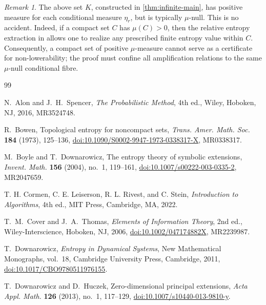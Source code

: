 \documentclass[12pt,letterpaper,reqno]{amsart}
\theoremstyle{definition}
\theoremstyle{remark}
\newtheorem{remark}[theorem]{Remark}
\numberwithin{equation}{section}
\begin{document}
	\begin{remark}
		The above set $K$, constructed in \cref{thm:infinite-main}, has positive measure for each conditional measure $\eta_r$, but is typically $\mu$-null. This is no accident. Indeed, if a compact set $C$ has $\mu(C)>0$, then the relative entropy extraction in \cite[Proposition 4.3 and Lemma 4.1]{HYZ2014} allows one to realize any prescribed finite entropy value within $C$. Consequently, a compact set of positive $\mu$-measure cannot serve as a certificate for non-lowerability; the proof must confine all amplification relations to the same $\mu$-null conditional fibre.
	\end{remark}
	\begin{sloppypar}
		\begin{thebibliography}{99}
			
			N.~Alon and J.~H.~Spencer,
			\emph{The Probabilistic Method}, 4th ed.,
			Wiley, Hoboken, NJ, 2016,
			MR3524748.
			
			R.~Bowen,
			Topological entropy for noncompact sets,
			\emph{Trans. Amer. Math. Soc.} \textbf{184} (1973), 125--136,
			\href{https://doi.org/10.1090/S0002-9947-1973-0338317-X}
			{doi:10.1090/S0002-9947-1973-0338317-X},
			MR0338317.
			
			M.~Boyle and T.~Downarowicz,
			The entropy theory of symbolic extensions,
			\emph{Invent. Math.} \textbf{156} (2004), no.~1, 119--161,
			\href{https://doi.org/10.1007/s00222-003-0335-2}
			{doi:10.1007/s00222-003-0335-2},
			MR2047659.
			
			T. H. Cormen, C. E. Leiserson, R. L. Rivest, and C. Stein, \emph{Introduction to Algorithms}, 4th ed., MIT Press, Cambridge, MA, 2022.
			
			T.~M.~Cover and J.~A.~Thomas,
			\emph{Elements of Information Theory}, 2nd ed.,
			Wiley-Interscience, Hoboken, NJ, 2006,
			\href{https://doi.org/10.1002/047174882X}
			{doi:10.1002/047174882X},
			MR2239987.
			
			T.~Downarowicz,
			\emph{Entropy in Dynamical Systems},
			New Mathematical Monographs, vol.~18,
			Cambridge University Press, Cambridge, 2011,
			\href{https://doi.org/10.1017/CBO9780511976155}
			{doi:10.1017/CBO9780511976155}.
			
			T.~Downarowicz and D.~Huczek,
			Zero-dimensional principal extensions,
			\emph{Acta Appl. Math.} \textbf{126} (2013), no.~1, 117--129,
			\href{https://doi.org/10.1007/s10440-013-9810-y}
			{doi:10.1007/s10440-013-9810-y}.
			

\end{thebibliography}
\end{sloppypar}
\end{document}
